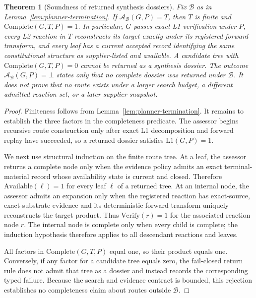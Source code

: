 \documentclass{article}
\newtheorem{theorem}{Theorem}[section]
\begin{document}
\begin{theorem}[Soundness of returned synthesis dossiers]
\label{thm:dossier-soundness}
Fix $\mathcal{B}$ as in Lemma~\ref{lem:planner-termination}.
If $\mathcal{A}_{\mathcal{B}}(G,P)=T$, then $T$ is finite and
$\mathrm{Complete}(G,T,P)=1$.
In particular, $G$ passes exact L1 verification under $P$, every L2 reaction in $T$ reconstructs its
target exactly under its registered forward transform, and every leaf has a current accepted record
identifying the same constitutional structure as supplier-listed and available.
A candidate tree with $\mathrm{Complete}(G,T,P)=0$ cannot be returned as a synthesis dossier.
The outcome $\mathcal{A}_{\mathcal{B}}(G,P)=\bot$ states only that no complete dossier was returned
under $\mathcal{B}$.
It does not prove that no route exists under a larger search budget, a different admitted reaction
set, or a later supplier snapshot.
\end{theorem}

\begin{proof}
Finiteness follows from Lemma~\ref{lem:planner-termination}.
It remains to establish the three factors in the completeness predicate.
The assessor begins recursive route construction only after exact L1 decomposition and forward
replay have succeeded, so a returned dossier satisfies $\mathrm{L1}(G,P)=1$.

We next use structural induction on the finite route tree.
At a leaf, the assessor returns a complete node only when the evidence policy admits an exact
terminal-material record whose availability state is current and closed.
Therefore $\mathrm{Available}(\ell)=1$ for every leaf $\ell$ of a returned tree.
At an internal node, the assessor admits an expansion only when the registered reaction has
exact-source, exact-substrate evidence and its deterministic forward transform uniquely reconstructs
the target product.
Thus $\mathrm{Verify}(r)=1$ for the associated reaction node $r$.
The internal node is complete only when every child is complete; the induction hypothesis therefore
applies to all descendant reactions and leaves.

All factors in $\mathrm{Complete}(G,T,P)$ equal one, so their product equals one.
Conversely, if any factor for a candidate tree equals zero, the fail-closed return rule does not
admit that tree as a dossier and instead records the corresponding typed failure.
Because the search and evidence contract is bounded, this rejection establishes no completeness
claim about routes outside $\mathcal{B}$.
\end{proof}
\end{document}
